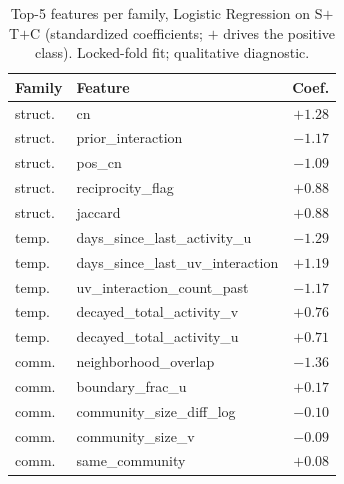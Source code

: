 \documentclass[conference]{IEEEtran}
\begin{document}
\begin{table}[t]
\caption{Top-5 features per family, Logistic Regression on S$+$T$+$C
(standardized coefficients; $+$ drives the positive class). Locked-fold
fit; qualitative diagnostic.}
\label{tab:imp_lr_topfam}
\centering
\small
\begin{tabular}{llr}
\toprule
Family & Feature & Coef. \\
\midrule
struct.\ & cn                          & $+1.28$ \\
struct.\ & prior\_interaction          & $-1.17$ \\
struct.\ & pos\_cn                     & $-1.09$ \\
struct.\ & reciprocity\_flag           & $+0.88$ \\
struct.\ & jaccard                     & $+0.88$ \\
\addlinespace
temp.\   & days\_since\_last\_activity\_u  & $-1.29$ \\
temp.\   & days\_since\_last\_uv\_interaction & $+1.19$ \\
temp.\   & uv\_interaction\_count\_past & $-1.17$ \\
temp.\   & decayed\_total\_activity\_v & $+0.76$ \\
temp.\   & decayed\_total\_activity\_u & $+0.71$ \\
\addlinespace
comm.\   & neighborhood\_overlap       & $-1.36$ \\
comm.\   & boundary\_frac\_u           & $+0.17$ \\
comm.\   & community\_size\_diff\_log  & $-0.10$ \\
comm.\   & community\_size\_v          & $-0.09$ \\
comm.\   & same\_community             & $+0.08$ \\
\bottomrule
\end{tabular}
\end{table}
\end{document}
